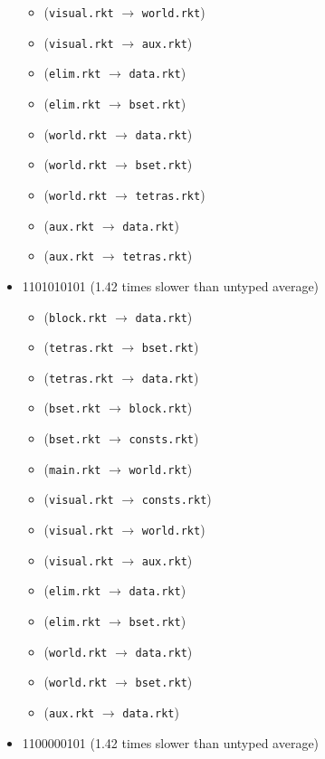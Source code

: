 \documentclass{article}
\newcommand{\mono}[1]{\texttt{#1}}
\begin{document}
\begin{itemize}
\begin{itemize}
  \item (\mono{visual.rkt} $\rightarrow$ \mono{world.rkt})
  \item (\mono{visual.rkt} $\rightarrow$ \mono{aux.rkt})
  \item (\mono{elim.rkt} $\rightarrow$ \mono{data.rkt})
  \item (\mono{elim.rkt} $\rightarrow$ \mono{bset.rkt})
  \item (\mono{world.rkt} $\rightarrow$ \mono{data.rkt})
  \item (\mono{world.rkt} $\rightarrow$ \mono{bset.rkt})
  \item (\mono{world.rkt} $\rightarrow$ \mono{tetras.rkt})
  \item (\mono{aux.rkt} $\rightarrow$ \mono{data.rkt})
  \item (\mono{aux.rkt} $\rightarrow$ \mono{tetras.rkt})
  \end{itemize}
\item 1101010101 (1.42 times slower than untyped average)
  \begin{itemize}
  \item (\mono{block.rkt} $\rightarrow$ \mono{data.rkt})
  \item (\mono{tetras.rkt} $\rightarrow$ \mono{bset.rkt})
  \item (\mono{tetras.rkt} $\rightarrow$ \mono{data.rkt})
  \item (\mono{bset.rkt} $\rightarrow$ \mono{block.rkt})
  \item (\mono{bset.rkt} $\rightarrow$ \mono{consts.rkt})
  \item (\mono{main.rkt} $\rightarrow$ \mono{world.rkt})
  \item (\mono{visual.rkt} $\rightarrow$ \mono{consts.rkt})
  \item (\mono{visual.rkt} $\rightarrow$ \mono{world.rkt})
  \item (\mono{visual.rkt} $\rightarrow$ \mono{aux.rkt})
  \item (\mono{elim.rkt} $\rightarrow$ \mono{data.rkt})
  \item (\mono{elim.rkt} $\rightarrow$ \mono{bset.rkt})
  \item (\mono{world.rkt} $\rightarrow$ \mono{data.rkt})
  \item (\mono{world.rkt} $\rightarrow$ \mono{bset.rkt})
  \item (\mono{aux.rkt} $\rightarrow$ \mono{data.rkt})
  \end{itemize}
\item 1100000101 (1.42 times slower than untyped average)

\end{itemize}
\end{document}
